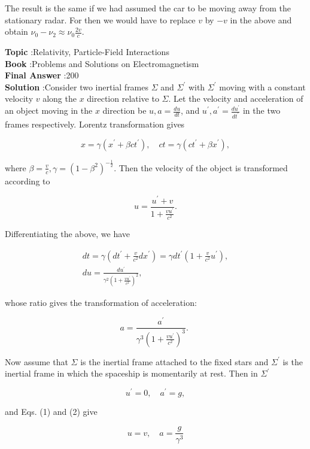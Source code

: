 \documentclass[10pt]{article}
\begin{document}
The result is the same if we had assumed the car to be moving away from the stationary radar. For then we would have to replace $v$ by $-v$ in the above and obtain $\nu_{0}-\nu_{2} \approx \nu_{0} \frac{2 v}{c}$.

\textbf{Topic} :Relativity, Particle-Field Interactions\\
\textbf{Book} :Problems and Solutions on Electromagnetism\\
\textbf{Final Answer} :200 \\


\textbf{Solution} :Consider two inertial frames $\Sigma$ and $\Sigma^{\prime}$ with $\Sigma^{\prime}$ moving with a constant velocity $v$ along the $x$ direction relative to $\Sigma$. Let the velocity and acceleration of an object moving in the $x$ direction be $u, a=\frac{d u}{d t}$, and $u^{\prime}, a^{\prime}=\frac{d u^{\prime}}{d t^{\prime}}$ in the two frames respectively. Lorentz transformation gives

$$
x=\gamma\left(x^{\prime}+\beta c t^{\prime}\right), \quad c t=\gamma\left(c t^{\prime}+\beta x^{\prime}\right),
$$

where $\beta=\frac{v}{c}, \gamma=\left(1-\beta^{2}\right)^{-\frac{1}{2}}$. Then the velocity of the object is transformed according to

$$
u=\frac{u^{\prime}+v}{1+\frac{v u^{\prime}}{c^{2}}} .
$$

Differentiating the above, we have

$$
\begin{gathered}
d t=\gamma\left(d t^{\prime}+\frac{v}{c^{2}} d x^{\prime}\right)=\gamma d t^{\prime}\left(1+\frac{v}{c^{2}} u^{\prime}\right), \\
d u=\frac{d u^{\prime}}{\gamma^{2}\left(1+\frac{v u^{\prime}}{c^{2}}\right)^{2}},
\end{gathered}
$$

whose ratio gives the transformation of acceleration:

$$
a=\frac{a^{\prime}}{\gamma^{3}\left(1+\frac{v u^{\prime}}{c^{2}}\right)^{3}} \text {. }
$$

Now assume that $\Sigma$ is the inertial frame attached to the fixed stars and $\Sigma^{\prime}$ is the inertial frame in which the spaceship is momentarily at rest. Then in $\Sigma^{\prime}$

$$
u^{\prime}=0, \quad a^{\prime}=g,
$$

and Eqs.
(1) and (2) give

$$
u=v, \quad a=\frac{g}{\gamma^{3}}
$$
\end{document}
